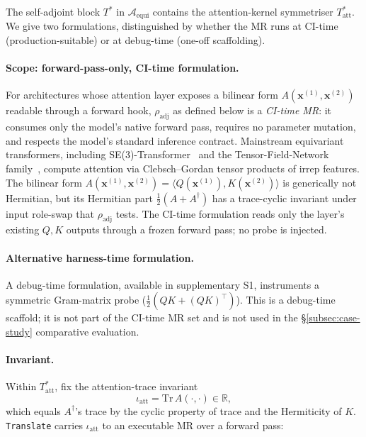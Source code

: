 \documentclass[acmsmall, screen]{acmart}
\begin{document}
The self-adjoint block $T^{*}$ in $\mathcal{A}_{\mathrm{equi}}$ contains the attention-kernel symmetriser $T^{*}_{\mathrm{att}}$. We give two formulations, distinguished by whether the MR runs at CI-time (production-suitable) or at debug-time (one-off scaffolding).

\paragraph{Scope: forward-pass-only, CI-time formulation.} For architectures whose attention layer exposes a bilinear form $A(\mathbf{x}^{(1)}, \mathbf{x}^{(2)})$ readable through a forward hook, $\rho_{\mathrm{adj}}$ as defined below is a \emph{CI-time MR}: it consumes only the model's native forward pass, requires no parameter mutation, and respects the model's standard inference contract. Mainstream equivariant transformers, including SE(3)-Transformer~\cite{FuchsTransformer2020} and the Tensor-Field-Network family~\cite{ThomasSmidt2018}, compute attention via Clebsch--Gordan tensor products of irrep features. The bilinear form $A(\mathbf{x}^{(1)}, \mathbf{x}^{(2)}) = \langle Q(\mathbf{x}^{(1)}), K(\mathbf{x}^{(2)}) \rangle$ is generically not Hermitian, but its Hermitian part $\tfrac{1}{2}(A + A^{\dagger})$ has a trace-cyclic invariant under input role-swap that $\rho_{\mathrm{adj}}$ tests. The CI-time formulation reads only the layer's existing $Q,K$ outputs through a frozen forward pass; no probe is injected.

\paragraph{Alternative harness-time formulation.} A debug-time formulation, available in supplementary S1, instruments a symmetric Gram-matrix probe ($\frac{1}{2}(QK + (QK)^\top)$). This is a debug-time scaffold; it is not part of the CI-time MR set and is not used in the §\ref{subsec:case-study} comparative evaluation.

\paragraph{Invariant.} Within $T^{*}_{\mathrm{att}}$, fix the attention-trace invariant
$$\iota_{\mathrm{att}} = \mathrm{Tr}\,A(\cdot, \cdot) \in \mathbb{R},$$
which equals $A^{\dagger}$'s trace by the cyclic property of trace and the Hermiticity of $K$. \texttt{Translate} carries $\iota_{\mathrm{att}}$ to an executable MR over a forward pass:
\end{document}
